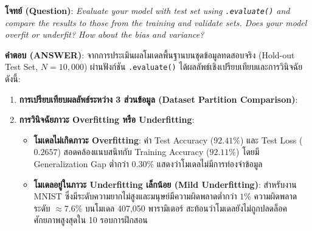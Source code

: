 \documentclass[12pt,a4paper]{article}
\begin{document}
\begin{ansbox}
\textbf{โจทย์ (Question)}: \textit{Evaluate your model with test set using \texttt{.evaluate()} and compare the results to those from the training and validate sets. Does your model overfit or underfit? How about the bias and variance?}

\vspace{0.4em}
\textbf{คำตอบ (ANSWER)}:
จากการประเมินผลโมเดลพื้นฐานบนชุดข้อมูลทดสอบจริง (Hold-out Test Set, $N=10,000$) ผ่านฟังก์ชัน \texttt{.evaluate()} ได้ผลลัพธ์เชิงเปรียบเทียบและการวินิจฉัยดังนี้:

\begin{enumerate}[leftmargin=18pt, itemsep=3pt]
    \item \textbf{การเปรียบเทียบผลลัพธ์ระหว่าง 3 ส่วนข้อมูล (Dataset Partition Comparison)}:\par
    \vspace{0.25em}
    \noindent{}\par
    \vspace{0.25em}
    \item \textbf{การวินิจฉัยภาวะ Overfitting หรือ Underfitting}:
    \begin{itemize}[leftmargin=12pt, itemsep=2pt]
        \item \textbf{โมเดลไม่เกิดภาวะ Overfitting}: ค่า Test Accuracy ($92.41\%$) และ Test Loss ($0.2657$) สอดคล้องแนบสนิทกับ Training Accuracy ($92.11\%$) โดยมี Generalization Gap ต่ำกว่า $0.30\%$ แสดงว่าโมเดลไม่มีการท่องจำข้อมูล
        \item \textbf{โมเดลอยู่ในภาวะ Underfitting เล็กน้อย (Mild Underfitting)}: สำหรับงาน MNIST ซึ่งมีระดับความยากไม่สูงและมนุษย์มีความผิดพลาดต่ำกว่า $1\%$ ความผิดพลาดระดับ $\approx 7.6\%$ บนโมเดล 407,050 พารามิเตอร์ สะท้อนว่าโมเดลยังไม่ถูกปลดล็อคศักยภาพสูงสุดใน 10 รอบการฝึกสอน
    \end{itemize}

\end{enumerate}
\end{ansbox}
\end{document}
